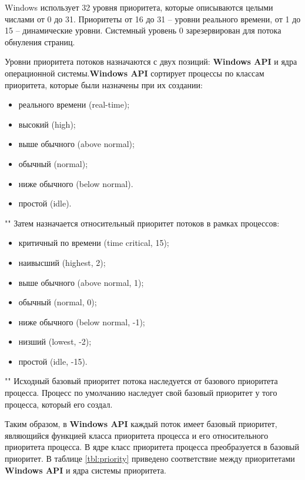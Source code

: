 \documentclass[a4paper,12pt]{extreport}
\begin{document}
Windows использует 32 уровня приоритета, которые описываются целыми числами от 0 до 31. Приоритеты от 16 до 31 -- уровни реального времени, от 1 до 15 -- динамические уровни. Системный уровень 0 зарезервирован для потока обнуления страниц.

Уровни приоритета потоков назначаются с двух позиций: \textbf{Windows API} и ядра операционной системы.\textbf{Windows API} сортирует процессы по классам приоритета, которые были назначены при их создании:

\begin{itemize}
	\item реального времени (real-time);
	\item высокий (high);
	\item выше обычного (above normal);
	\item обычный (normal);
	\item ниже обычного (below normal).
	\item простой (idle).
\end{itemize}

""\newline
Затем назначается относительный приоритет потоков в рамках процессов:

\begin{itemize} 
	\item критичный по времени (time critical, 15);
	\item наивысший (highest, 2);
	\item выше обычного (above normal, 1);
	\item обычный (normal, 0);
	\item ниже обычного (below normal, -1);
	\item низший (lowest, -2);
	\item простой (idle, -15).
\end{itemize} 

""\newline
Исходный базовый приоритет потока наследуется от базового приоритета процесса. Процесс по умолчанию наследует свой базовый приоритет у того процесса, который его создал. 

Таким образом, в \textbf{Windows API} каждый поток имеет базовый приоритет, являю­щийся функцией класса приоритета процесса и его относительного приоритета процесса. В  ядре класс приоритета процесса преобразуется в базовый приоритет. В таблице \ref{tbl:priority} приведено соответствие между приоритетами \textbf{Windows API} и ядра системы приоритета.
\end{document}
